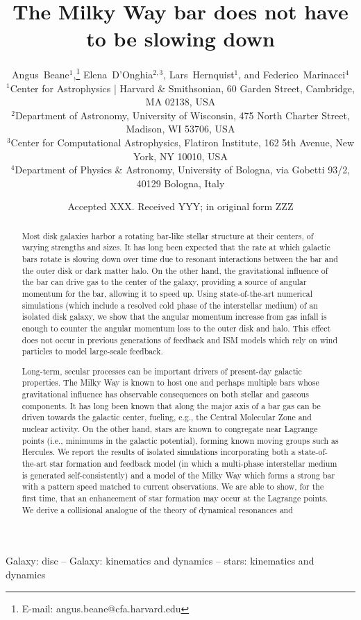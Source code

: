 \documentclass[a4paper,fleqn,usenatbib]{mnras}
\title[Bars slowing down]{The Milky Way bar does not have to be slowing down}
\author[A. Beane et al.]{
Angus~Beane$^{1}$,\thanks{E-mail: angus.beane@cfa.harvard.edu}
Elena~D'Onghia$^{2,3}$,
Lars~Hernquist$^{1}$,
and Federico~Marinacci$^{4}$
\\
$^{1}$Center for Astrophysics {\normalfont |} Harvard \& Smithsonian, 60 Garden Street, Cambridge, MA 02138, USA\\
$^{2}$Department of Astronomy, University of Wisconsin, 475 North Charter Street, Madison, WI 53706, USA\\
$^{3}$Center for Computational Astrophysics, Flatiron Institute, 162 5th Avenue, New York, NY 10010, USA\\
$^{4}$Department of Physics \& Astronomy, University of Bologna, via Gobetti 93/2, 40129 Bologna, Italy
}
\date{Accepted XXX. Received YYY; in original form ZZZ}
\begin{document}
\label{firstpage}
\pagerange{\pageref{firstpage}--\pageref{lastpage}}
\maketitle

\begin{abstract}
Most disk galaxies harbor a rotating bar-like stellar structure at their
centers, of varying strengths and sizes. It has long been expected that the
rate at which galactic bars rotate is slowing down over time due to resonant
interactions between the bar and the outer disk or dark matter halo. On the
other hand, the gravitational influence of the bar can drive gas to the center
of the galaxy, providing a source of angular momentum for the bar, allowing it
to speed up. Using state-of-the-art numerical simulations (which include a
resolved cold phase of the interstellar medium) of an isolated disk galaxy, we
show that the angular momentum increase from gas infall is enough to counter
the angular momentum loss to the outer disk and halo. This effect does not
occur in previous generations of feedback and ISM models which rely on wind
particles to model large-scale feedback. 

Long-term, secular processes can be important drivers of present-day galactic
properties. The Milky Way is known to host one and perhaps multiple bars whose
gravitational influence has observable consequences on both stellar and
gaseous components. It has long been known that along the major axis of a bar
gas can be driven towards the galactic center, fueling, e.g., the Central
Molecular Zone and nuclear activity. On the other hand, stars are known to
congregate near Lagrange points (i.e., minimums in the galactic potential),
forming known moving groups such as Hercules. We report the results of
isolated simulations incorporating both a state-of-the-art star formation and
feedback model (in which a multi-phase interstellar medium is generated
self-consistently) and a model of the Milky Way which forms a strong bar with
a pattern speed matched to current observations. We are able to show, for the
first time, that an enhancement of star formation may occur at the Lagrange
points. We derive a collisional analogue of the theory of dynamical resonances
and
\end{abstract}

\begin{keywords}
Galaxy: disc -- Galaxy: kinematics and dynamics -- stars: kinematics and dynamics
\end{keywords}
\end{document}
